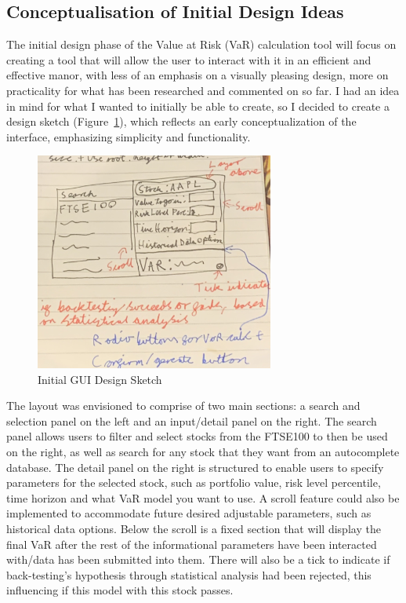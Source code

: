 \documentclass{article}
\begin{document}
\subsection{Conceptualisation of Initial Design Ideas}

The initial design phase of the Value at Risk (VaR) calculation tool will focus on creating a tool that will allow the user to interact with it in an efficient and effective manor, with less of an emphasis on a visually pleasing design, more on practicality for what has been researched and commented on so far. I had an idea in mind for what I wanted to initially be able to create, so I decided to create a design sketch (Figure~\ref{fig:InitialDesignSketch}), which reflects an early conceptualization of the interface, emphasizing simplicity and functionality.

\begin{figure}[h]
  \centering
  \includegraphics[width=0.7\textwidth]{Images/Initial Design Sketch.jpg}
  \caption{Initial GUI Design Sketch}
  \label{fig:InitialDesignSketch}
\end{figure}

The layout was envisioned to comprise of two main sections: a search and selection panel on the left and an input/detail panel on the right. The search panel allows users to filter and select stocks from the FTSE100 to then be used on the right, as well as search for any stock that they want from an autocomplete database. The detail panel on the right is structured to enable users to specify parameters for the selected stock, such as portfolio value, risk level percentile, time horizon and what VaR model you want to use. A scroll feature could also be implemented to accommodate future desired adjustable parameters, such as historical data options. Below the scroll is a fixed section that will display the final VaR after the rest of the informational parameters have been interacted with/data has been submitted into them. There will also be a tick to indicate if back-testing's hypothesis through statistical analysis had been rejected, this influencing if this model with this stock passes.\\\vspace{0.3cm}
\end{document}
